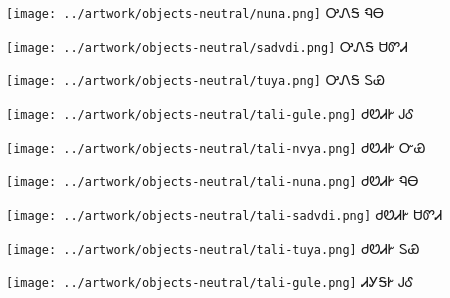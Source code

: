 \documentclass[avery5371,frame]{flashcards}%
\begin{document}
\begin{flashcard}{
\texttt{[image: ../artwork/objects-neutral/nuna.png]}
}\Huge ᎤᏁᎦ ᏄᎾ
\end{flashcard}

\begin{flashcard}{
\texttt{[image: ../artwork/objects-neutral/sadvdi.png]}
}\Huge ᎤᏁᎦ ᏌᏛᏗ
\end{flashcard}

\begin{flashcard}{
\texttt{[image: ../artwork/objects-neutral/tuya.png]}
}\Huge ᎤᏁᎦ ᏚᏯ
\end{flashcard}

\begin{flashcard}{
\texttt{[image: ../artwork/objects-neutral/tali-gule.png]}
}\Huge ᏧᏬᏗᎨ ᎫᎴ
\end{flashcard}

\begin{flashcard}{
\texttt{[image: ../artwork/objects-neutral/tali-nvya.png]}
}\Huge ᏧᏬᏗᎨ ᏅᏯ
\end{flashcard}

\begin{flashcard}{
\texttt{[image: ../artwork/objects-neutral/tali-nuna.png]}
}\Huge ᏧᏬᏗᎨ ᏄᎾ
\end{flashcard}

\begin{flashcard}{
\texttt{[image: ../artwork/objects-neutral/tali-sadvdi.png]}
}\Huge ᏧᏬᏗᎨ ᏌᏛᏗ
\end{flashcard}

\begin{flashcard}{
\texttt{[image: ../artwork/objects-neutral/tali-tuya.png]}
}\Huge ᏧᏬᏗᎨ ᏚᏯ
\end{flashcard}

\begin{flashcard}{
\texttt{[image: ../artwork/objects-neutral/tali-gule.png]}
}\Huge ᏗᎩᎦᎨ ᎫᎴ
\end{flashcard}
\end{document}
